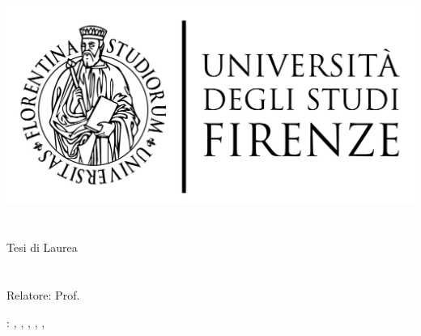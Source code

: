 \begin{titlepage}
	\begin{center}
   	\large
      \hfill
      \vfill
      \begingroup
         \includegraphics[scale=0.15]{1-front/logo/LOGO}\\
			\myFaculty \\
			\vspace{0.5cm}
			\myDegree \\ 
         \vspace{0.5cm}    
         Tesi di Laurea 
      \endgroup 
      \vfill 
      \begingroup
      	\color{Maroon}\spacedallcaps{\myItalianTitle} \\ $\ $\\
      	\spacedallcaps{\myEnglishTitle} \\ 	
	\bigskip
      \endgroup
      \spacedlowsmallcaps{\myName}
      \vfill 
      \vfill
      Relatore: Prof. \emph{\myRelatore}\\
      \vfill
      \vfill
      \myTime
      \vfill                      
	\end{center}        
\end{titlepage}   
   \newpage
	\thispagestyle{empty}
	\hfill
	\vfill
	\noindent\myName: 
	\textit{\myItalianTitle,} 
	\myVersione,
	\myDegree, \mycopyright, \myUni, \myTime
